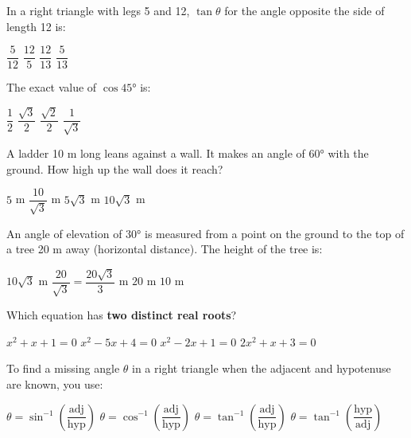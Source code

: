 \documentclass[addpoints]{exam}
\begin{document}
\begin{questions}
\question[1] In a right triangle with legs 5 and 12, $\tan\theta$ for the angle opposite the side of length 12 is:
\begin{choices}
    \choice $\dfrac{5}{12}$
    \correctchoice $\dfrac{12}{5}$
    \choice $\dfrac{12}{13}$
    \choice $\dfrac{5}{13}$
\end{choices}
\vspace{3mm}

\question[1] The exact value of $\cos 45°$ is:
\begin{choices}
    \choice $\dfrac{1}{2}$
    \choice $\dfrac{\sqrt{3}}{2}$
    \correctchoice $\dfrac{\sqrt{2}}{2}$
    \choice $\dfrac{1}{\sqrt{3}}$
\end{choices}
\vspace{3mm}

\question[1] A ladder 10 m long leans against a wall. It makes an angle of $60°$ with the ground. How high up the wall does it reach?
\begin{choices}
    \choice $5$ m
    \choice $\dfrac{10}{\sqrt{3}}$ m
    \correctchoice $5\sqrt{3}$ m
    \choice $10\sqrt{3}$ m
\end{choices}
\vspace{3mm}

\question[1] An angle of elevation of $30°$ is measured from a point on the ground to the top of a tree 20 m away (horizontal distance). The height of the tree is:
\begin{choices}
    \choice $10\sqrt{3}$ m
    \correctchoice $\dfrac{20}{\sqrt{3}} = \dfrac{20\sqrt{3}}{3}$ m
    \choice $20$ m
    \choice $10$ m
\end{choices}
\vspace{3mm}

\question[1] Which equation has \textbf{two distinct real roots}?
\begin{choices}
    \choice $x^2 + x + 1 = 0$
    \correctchoice $x^2 - 5x + 4 = 0$
    \choice $x^2 - 2x + 1 = 0$
    \choice $2x^2 + x + 3 = 0$
\end{choices}
\vspace{3mm}

\question[1] To find a missing angle $\theta$ in a right triangle when the adjacent and hypotenuse are known, you use:
\begin{choices}
    \choice $\theta = \sin^{-1}\!\left(\dfrac{\text{adj}}{\text{hyp}}\right)$
    \correctchoice $\theta = \cos^{-1}\!\left(\dfrac{\text{adj}}{\text{hyp}}\right)$
    \choice $\theta = \tan^{-1}\!\left(\dfrac{\text{adj}}{\text{hyp}}\right)$
    \choice $\theta = \tan^{-1}\!\left(\dfrac{\text{hyp}}{\text{adj}}\right)$
\end{choices}
\vspace{3mm}


\end{questions}
\end{document}

